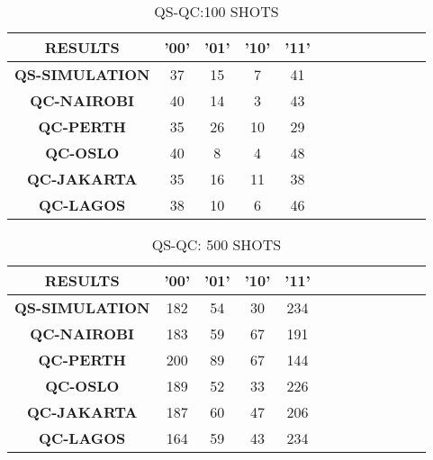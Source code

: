 \begin{table}[!ht]
    \raggedleft
    \begin{tabular}{cccccccccc}
    \hline
        \textbf{RESULTS} & \textbf{'00'} & \textbf{'01'} & \textbf{'10'} & \textbf{'11' } & \textbf{} & \textbf{} & \textbf{} & \textbf{} & \textbf{} \\ \hline
        \textbf{QS-SIMULATION} & 37 & 15 & 7 & 41  & ~ & ~ & ~ & ~ & ~ \\ 
        \textbf{QC-NAIROBI} & 40 & 14 & 3 & 43  & ~ & ~ & ~ & ~ & ~ \\ 
        \textbf{QC-PERTH} & 35 & 26 & 10 & 29  & ~ & ~ & ~ & ~ & ~ \\ 
        \textbf{QC-OSLO} & 40 & 8 & 4 & 48  & ~ & ~ & ~ & ~ & ~ \\ 
        \textbf{QC-JAKARTA} & 35 & 16 & 11 & 38  & ~ & ~ & ~ & ~ & ~ \\ 
        \textbf{QC-LAGOS} & 38 & 10 & 6 & 46 & ~ & ~ & ~ & ~ & ~ \\  \hline
    \end{tabular}
    \caption{QS-QC:100 SHOTS}
\end{table}


\begin{table}[!ht]
    \raggedleft
    \begin{tabular}{cccccccccc}
    \hline
        \textbf{RESULTS} & \textbf{'00'} & \textbf{'01'} & \textbf{'10'} & \textbf{'11' } & \textbf{} & \textbf{} & \textbf{} & \textbf{} & \textbf{} \\ \hline
        \textbf{QS-SIMULATION} & 182 & 54 & 30 & 234  & ~ & ~ & ~ & ~ & ~ \\ 
        \textbf{QC-NAIROBI} & 183 & 59 & 67 & 191  & ~ & ~ & ~ & ~ & ~ \\ 
        \textbf{QC-PERTH} & 200 & 89 & 67 & 144  & ~ & ~ & ~ & ~ & ~ \\ 
        \textbf{QC-OSLO} & 189 & 52 & 33 & 226  & ~ & ~ & ~ & ~ & ~ \\ 
        \textbf{QC-JAKARTA} & 187 & 60 & 47 & 206  & ~ & ~ & ~ & ~ & ~ \\ 
        \textbf{QC-LAGOS} & 164 & 59 & 43 & 234 & ~ & ~ & ~ & ~ & ~ \\  \hline
    \end{tabular}
    \caption{QS-QC: 500 SHOTS}
\end{table}

